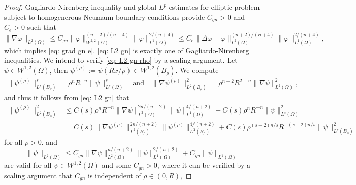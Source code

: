 \begin{proof}
  Gagliardo-Nirenberg inequality \cite{Nirenberg1959} and 
  global $L^p$-estimates for elliptic problem subject to homogenerous Neumann boundary conditions provide $C_{gn} > 0$ and $C_e > 0$ 
  such that 
  \begin{displaymath}
    \|\nabla \varphi\|_{L^2(\Omega)} 
    \leq C_{gn} \|\varphi\|_{W^{2,2}(\Omega)}^{(n+2)/(n+4)} 
    \|\varphi\|_{L^1(\Omega)}^{2/(n+4)}
    \leq C_e \|\Delta \varphi - \varphi\|_{L^2(\Omega)}^{(n+2)/(n+4)} 
    \|\varphi\|_{L^1(\Omega)}^{2/(n+4)},
  \end{displaymath}
  which implies \eqref{eq: grad gn e}.
  \eqref{eq: L2 gn} is exactly one of Gagliardo-Nirenberg inequalities.
  We intend to verify \eqref{eq: L2 gn rho} by a scaling argument.
  Let $\psi\in W^{1,2}(\Omega)$, 
  then $\psi^{(\rho)} := \psi(Rx/\rho) \in W^{1,2}(B_\rho)$.
  We compute 
  \begin{align*}
    \|\psi^{(\rho)}\|_{L^s(B_\rho)}^s
    = \rho^nR^{-n}\|\psi\|_{L^s(\Omega)}^s
    \quad \text{and}\quad
    \|\nabla\psi^{(\rho)}\|_{L^2(B_\rho)}^2
    = \rho^{n-2}R^{2-n}\|\nabla\psi\|_{L^2(\Omega)}^2,
  \end{align*} 
  and thus it follows from \eqref{eq: L2 gn} that  
  \begin{displaymath}
    \begin{aligned} 
    \|\psi^{(\rho)}\|_{L^2(B_\rho)}^2 
    &\leq C(s) \rho^nR^{-n}\|\nabla \psi\|_{L^2(\Omega)}^{2n/(n+2)}\|\psi\|_{L^1(\Omega)}^{4/(n+2)} 
    + C(s)\rho^nR^{-n}\|\psi\|_{L^{s}(\Omega)}^2\\
    &= C(s) \|\nabla \psi^{(\rho)}\|_{L^2(B_\rho)}^{2n/(n+2)}\|\psi^{(\rho)}\|_{L^1(B_\rho)}^{4/(n+2)} 
    + C(s)\rho^{(s-2)n/s}R^{-(s-2)n/s}\|\psi\|_{L^{s}(B_\rho)}^2
    \end{aligned}
  \end{displaymath}
  for all $\rho > 0$.
  and 
  \begin{displaymath}
    \|\psi\|_{L^2(\Omega)} 
    \leq C_{gn} \|\nabla \psi\|_{L^2(\Omega)}^{n/(n+2)}\|\psi\|_{L^1(\Omega)}^{2/(n+2)} 
    + C_{gn}\|\psi\|_{L^1(\Omega)}
  \end{displaymath}
  are valid for all $\psi\in W^{1,2}(\Omega)$ and some $C_{gn} > 0$, 
  where it can be verified by a scaling argument that 
$C_{gn}$ is independent of $\rho\in(0,R)$,
\end{proof}


